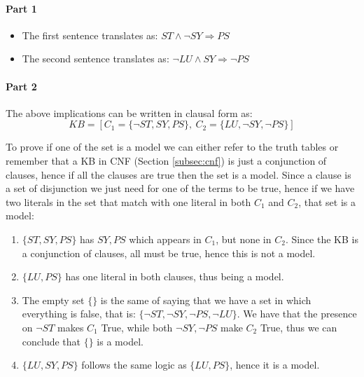 \documentclass[10pt,a4paper]{article}
\begin{document}
\begin{itemize}
\paragraph{Part 1}
\begin{itemize}
\item The first sentence translates as: $ST \wedge \neg SY \Rightarrow PS$
\item The second sentence translates as: $\neg LU \wedge SY \Rightarrow \neg PS$
\end{itemize}

\paragraph{Part 2}
The above implications can be written in clausal form as:
\[KB=[ C_1=\lbrace \neg ST, SY, PS \rbrace,\ C_2=\lbrace LU, \neg SY, \neg PS \rbrace]\]


To prove if one of the set is a model we can either refer to the truth tables or remember that a KB in CNF (Section \ref{subsec:cnf}) is just a conjunction of clauses, hence if all the clauses are true then the set is a model. Since a clause is a set of disjunction we just need for one of the terms to be true, hence if we have two literals in the set that match with one literal in both $C_1$ and $C_2$, that set is a model:
 

\begin{enumerate}

\item $\lbrace ST,SY,PS\rbrace$ has $SY,PS$ which appears in $C_1$, but none in $C_2$. Since the KB is a conjunction of clauses, all must be true, hence this is not a model.
\item $\lbrace LU,PS\rbrace$ has one literal in both clauses, thus being a model.
\item The empty set $\lbrace \rbrace$ is the same of saying that we have a set in which everything is false, that is: $\lbrace  \neg ST, \neg SY, \neg PS, \neg LU\rbrace$. We have that the presence on $\neg ST$ makes $C_1$ True, while both $\neg SY, \neg PS$ make $C_2$ True, thus we can conclude that $\lbrace \rbrace$  is a model.
\item $ \lbrace LU,SY,PS\rbrace$ follows the same logic as $\lbrace LU,PS\rbrace$, hence it is a model.
\end{enumerate}


\end{itemize}
\end{document}
